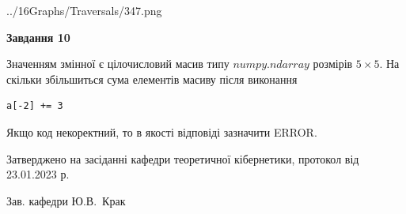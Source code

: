 \documentclass[12pt, ukrainian]{article}
\begin{document}
{\begin {large}
\begin{center}
	{../16Graphs/Traversals/347.png}
\end{center}\par
\newpage

{\begin {center}\textbf{Завдання 10}\end {center}}\par
Значенням змінної  є цілочисловий масив типу $numpy.ndarray$ розмірів $5{\times}5$. На скільки збільшиться сума елементів масиву  після виконання
\begin{verbatim}
a[-2] += 3
\end{verbatim}


Якщо код некоректний, то в якості відповіді зазначити ERROR.\par
\newpage


\end {large}
}
{\smallskip \begin {small} Затверджено на засіданні кафедри теоретичної кібернетики, протокол  від   23.01.2023 р.\par\smallskip\smallskip
{\parbox {6.5 cm}{Зав. кафедри \dotfill Ю.В.~Крак}} \end{small}}
\end{document}
